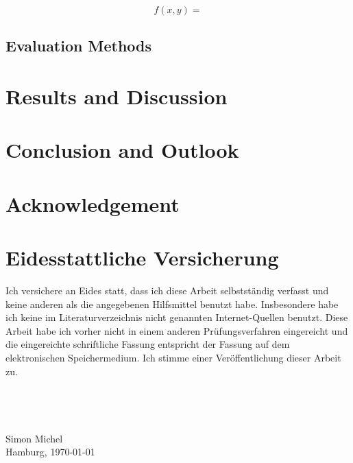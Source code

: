 \documentclass[11pt,twoside,a4paper,fleqn]{report}
\numberwithin{equation}{chapter}
\numberwithin{figure}{chapter}
\numberwithin{table}{chapter}
\begin{document}
\begin{center}
	
	
\end{center}
\begin{equation}
	f(x,y) = 
\end{equation}
\section{Evaluation Methods}
\chapter{Results and Discussion}
\chapter{Conclusion and Outlook}
\chapter{Acknowledgement}

\chapter{Eidesstattliche Versicherung}
Ich versichere an Eides statt, dass ich diese Arbeit selbstständig verfasst und keine anderen als die angegebenen Hilfsmittel benutzt habe. Insbesondere habe ich keine im Literaturverzeichnis nicht genannten Internet-Quellen benutzt. Diese Arbeit habe ich vorher nicht in einem anderen Prüfungsverfahren eingereicht und die eingereichte schriftliche Fassung entspricht der Fassung auf dem elektronischen Speichermedium. Ich stimme einer Veröffentlichung dieser Arbeit zu.
\\
\\
\\
\\
\\
Simon Michel\\
Hamburg, \today
\end{document}
